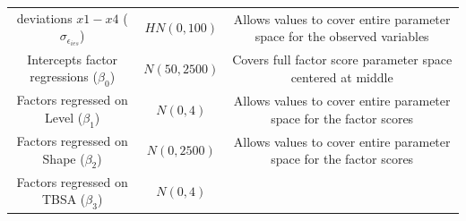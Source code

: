 \documentclass[openright,titlepage,12pt,a4paper]{book}
\begin{document}
\begin{longtable}[]{@{}ccc@{}}
\begin{minipage}[t]{0.29\columnwidth}
deviations \(x1-x4\)
(\(\sigma_{\epsilon_{ies}}\))\strut
\end{minipage} & \begin{minipage}[t]{0.16\columnwidth}\centering
\(HN(0, 100)\)\strut
\end{minipage} & \begin{minipage}[t]{0.45\columnwidth}\centering
Allows values to cover entire
parameter space for the observed
variables\strut
\end{minipage}\tabularnewline
\begin{minipage}[t]{0.29\columnwidth}\centering
Intercepts factor
regressions (\(\beta_0\))\strut
\end{minipage} & \begin{minipage}[t]{0.16\columnwidth}\centering
\(N(50, 2500)\)\strut
\end{minipage} & \begin{minipage}[t]{0.45\columnwidth}\centering
Covers full factor score parameter
space centered at middle\strut
\end{minipage}\tabularnewline
\begin{minipage}[t]{0.29\columnwidth}\centering
Factors regressed on
Level (\(\beta_1\))\strut
\end{minipage} & \begin{minipage}[t]{0.16\columnwidth}\centering
\(N(0, 4)\)\strut
\end{minipage} & \begin{minipage}[t]{0.45\columnwidth}\centering
Allows values to cover entire
parameter space for the factor scores\strut
\end{minipage}\tabularnewline
\begin{minipage}[t]{0.29\columnwidth}\centering
Factors regressed on
Shape (\(\beta_2\))\strut
\end{minipage} & \begin{minipage}[t]{0.16\columnwidth}\centering
\(N(0, 2500)\)\strut
\end{minipage} & \begin{minipage}[t]{0.45\columnwidth}\centering
Allows values to cover entire
parameter space for the factor scores\strut
\end{minipage}\tabularnewline
\begin{minipage}[t]{0.29\columnwidth}\centering
Factors regressed on
TBSA (\(\beta_3\))\strut
\end{minipage} & \begin{minipage}[t]{0.16\columnwidth}\centering
\(N(0, 4)\)\strut
\end{minipage} & \begin{minipage}[t]{0.45\columnwidth}\centering

\end{minipage}
\end{longtable}
\end{document}
